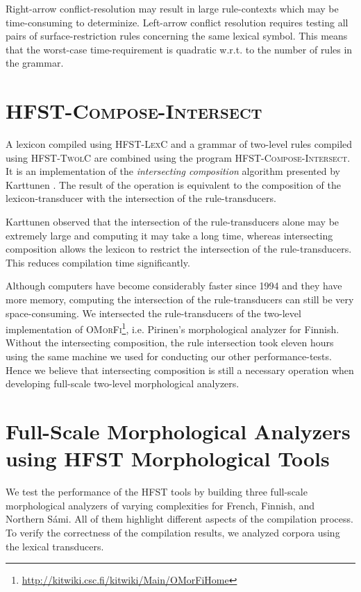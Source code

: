 \documentclass[a4paper]{article}
\begin{document}
Right-arrow conflict-resolution may result in large rule-contexts
which may be time-consuming to determinize. Left-arrow conflict
resolution requires testing all pairs of surface-restriction rules
concerning the same lexical symbol. This means that the worst-case
time-requirement is quadratic w.r.t. to the number of rules in the
grammar.

\section{\textsc{HFST-Compose-Intersect}}

A lexicon compiled using \textsc{HFST-LexC} and a grammar of two-level
rules compiled using \textsc{HFST-TwolC} are combined using the
program \textsc{HFST-Compose-Intersect}. It is an implementation of
the \textit{intersecting composition} algorithm presented by Karttunen
\cite{Karttunen94}. The result of the operation is equivalent to the
composition of the lexicon-transducer with the intersection of the
rule-transducers.

Karttunen \cite{Karttunen94} observed that the intersection of the
rule-transducers alone may be extremely large and computing it may
take a long time, whereas intersecting composition allows the lexicon
to restrict the intersection of the rule-transducers. This reduces
compilation time significantly.

Although computers have become considerably faster since 1994 and they
have more memory, computing the intersection of the rule-transducers
can still be very space-consuming. We intersected the rule-transducers
of the two-level implementation of
\textsc{OMorFi}\footnote{\url{http://kitwiki.csc.fi/kitwiki/Main/OMorFiHome}},
i.e. Pirinen's \cite{pirinen2008} morphological analyzer for
Finnish. Without the intersecting composition, the rule intersection
took eleven hours using the same machine we used for conducting our
other performance-tests. Hence we believe that intersecting
composition is still a necessary operation when developing full-scale
two-level morphological analyzers.

\section{Full-Scale Morphological Analyzers using \textsc{HFST} Morphological
Tools} 

We test the performance of the \textsc{HFST} tools by building three
full-scale morphological analyzers of varying complexities for French,
Finnish, and Northern S\'{a}mi. All of them highlight different
aspects of the compilation process. To verify the correctness of the
compilation results, we analyzed corpora using the lexical
transducers.
\end{document}
